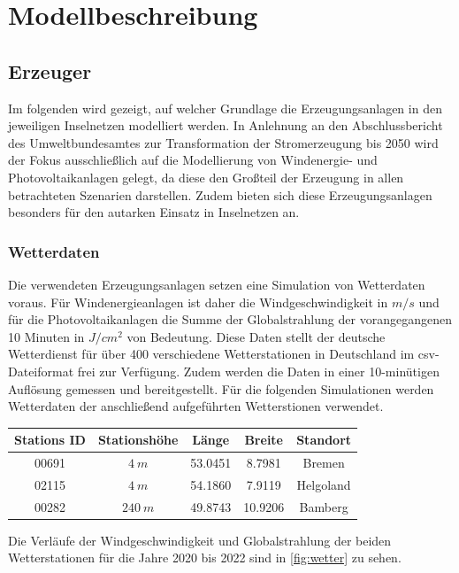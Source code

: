 \chapter{Modellbeschreibung}\label{Modellbeschreibung}
\section{Erzeuger}\label{Erzeuger}

Im folgenden wird gezeigt, auf welcher Grundlage die Erzeugungsanlagen in den jeweiligen Inselnetzen modelliert werden. In Anlehnung an den Abschlussbericht des Umweltbundesamtes zur Transformation der Stromerzeugung bis 2050 wird der Fokus ausschließlich auf die Modellierung von Windenergie- und Photovoltaikanlagen gelegt, da diese den Großteil der Erzeugung in allen betrachteten Szenarien darstellen. Zudem bieten sich diese Erzeugungsanlagen besonders für den autarken Einsatz in Inselnetzen an.

\subsection{Wetterdaten}

Die verwendeten Erzeugungsanlagen setzen eine Simulation von Wetterdaten voraus. Für Windenergieanlagen ist daher die Windgeschwindigkeit in $m/s$  und für die Photovoltaikanlagen die Summe der Globalstrahlung der vorangegangenen 10 Minuten in $J/cm^2$ von Bedeutung. Diese Daten stellt der deutsche Wetterdienst für über 400 verschiedene Wetterstationen in Deutschland im csv-Dateiformat frei zur Verfügung. Zudem werden die Daten in einer 10-minütigen Auflösung gemessen und bereitgestellt. Für die folgenden Simulationen werden Wetterdaten der anschließend aufgeführten Wetterstionen verwendet.

\begin{center}
	\begin{tabular}[htpb]{c|c|c|c|c}
		Stations ID & Stationshöhe & Länge & Breite & Standort \\
		\hline
		00691 & $4~m$ & 53.0451 & 8.7981 & Bremen \\
		02115 & $4~m$ & 54.1860 & 7.9119 & Helgoland \\
		00282 & $240~m$ & 49.8743 & 10.9206 & Bamberg 
	\end{tabular}
\end{center}

Die Verläufe der Windgeschwindigkeit und Globalstrahlung der beiden Wetterstationen für die Jahre 2020 bis 2022 sind in \autoref{fig:wetter} zu sehen.

